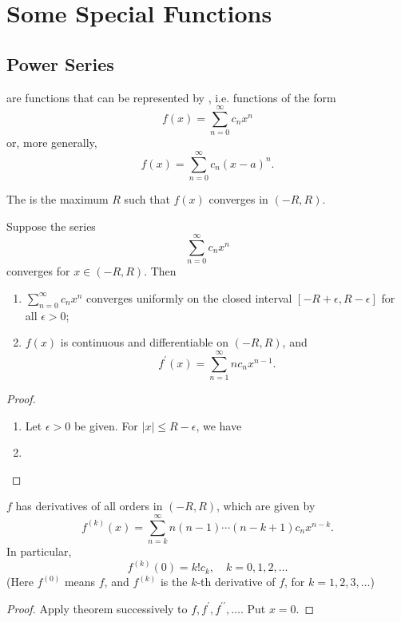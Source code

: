 \chapter{Some Special Functions}
\section{Power Series}
\begin{definition}
 are functions that can be represented by , i.e. functions of the form
\[f(x)=\sum_{n=0}^\infty c_n x^n\]
or, more generally,
\[f(x)=\sum_{n=0}^\infty c_n(x-a)^n.\]
\end{definition}

The  is the maximum $R$ such that $f(x)$ converges in $(-R,R)$.

\begin{theorem}
Suppose the series 
\[ \sum_{n=0}^\infty c_nx^n \]
converges for $x\in(-R,R)$. Then
\begin{enumerate}[label=(\arabic*)]
\item $\sum_{n=0}^\infty c_nx^n$ converges uniformly on the closed interval $[-R+\epsilon,R-\epsilon]$ for all $\epsilon>0$;
\item $f(x)$ is continuous and differentiable on $(-R,R)$, and 
\[ f^\prime(x)=\sum_{n=1}^\infty nc_nx^{n-1}. \]
\end{enumerate}
\end{theorem}

\begin{proof} \
\begin{enumerate}[label=(\arabic*)]
\item Let $\epsilon>0$ be given. For $|x|\le R-\epsilon$, we have
\item 
\end{enumerate}
\end{proof}

\begin{corollary}
$f$ has derivatives of all orders in $(-R,R)$, which are given by
\[f^{(k)}(x)=\sum_{n=k}^\infty n(n-1)\cdots(n-k+1)c_nx^{n-k}.\]
In particular,
\[f^{(k)}(0)=k!c_k,\quad k=0,1,2,\dots\]
(Here $f^{(0)}$ means $f$, and $f^{(k)}$ is the $k$-th derivative of $f$, for $k=1,2,3,\dots$)
\end{corollary}

\begin{proof}
Apply theorem successively to $f,f^\prime,f^{\prime\prime},\dots$. Put $x=0$.
\end{proof}

